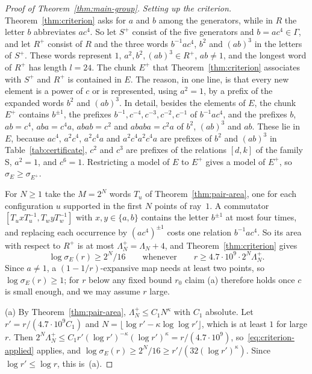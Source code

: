 \begin{proof}[Proof of Theorem~\ref{thm:main-group}]
\emph{Setting up the criterion.} Theorem~\ref{thm:criterion} asks for $a$ and $b$ among the generators, while in $R$ the letter $b$ abbreviates
$ac^4$. So let $S^+$ consist of the five generators and $b=ac^4\in\Gamma$, and let $R^+$ consist of $R$ and the three words $b^{-1}ac^4$, $b^2$
and $(ab)^3$ in the letters of $S^+$. These words represent $1$, $a^2,b^2,(ab)^3\in R^+$, $ab\ne1$, and the longest word of $R^+$ has length
$l=24$. The chunk $E^+$ that Theorem~\ref{thm:criterion} associates with $S^+$ and $R^+$ is contained in $E$. The reason, in one line, is that
every new element is a power of $c$ or is represented, using $a^2=1$, by a prefix of the expanded words $b^2$ and $(ab)^3$. In detail, besides
the elements of $E$, the chunk $E^+$ contains $b^{\pm1}$, the prefixes $b^{-1},c^{-4},c^{-3},c^{-2},c^{-1}$ of $b^{-1}ac^4$, and the prefixes $b$,
$ab=c^4$, $aba=c^4a$, $abab=c^2$ and $ababa=c^2a$ of $b^2$, $(ab)^3$ and $ab$. These lie in $E$, because $ac^4$, $a^2c^4$, $a^2c^4a$ and
$a^2c^4a^2c^4a$ are prefixes of $b^2$ and $(ab)^3$ in Table~\ref{tab:certificate}, $c^2$ and $c^3$ are prefixes of the relations $[d,k]$ of the
family \textsf{S}, $a^2=1$, and $c^6=1$. Restricting a model of $E$ to $E^+$ gives a model of $E^+$, so $\sigma_E\ge\sigma_{E^+}$.

For $N\ge1$ take the $M=2^N$ words $T_u$ of Theorem~\ref{thm:pair-area}, one for each configuration $u$ supported in the first $N$ points of
ray~$1$. A commutator $[T_uxT_u^{-1},T_wyT_w^{-1}]$ with $x,y\in\{a,b\}$ contains the letter $b^{\pm1}$ at most four times, and replacing each
occurrence by $(ac^4)^{\pm1}$ costs one relation $b^{-1}ac^4$. So its area with respect to $R^+$ is at most $\Lambda^+_N=\Lambda_N+4$, and
Theorem~\ref{thm:criterion} gives
\begin{equation}\label{eq:criterion-applied}
\log\sigma_E(r)\ge2^N/16\qquad\text{whenever}\qquad r\ge4.7\cdot10^{9}\cdot2^N\Lambda^+_N .
\end{equation}
Since $a\ne1$, a $(1-1/r)$-expansive map needs at least two points, so $\log\sigma_E(r)\ge1$; for $r$ below any fixed bound $r_0$ claim (a)
therefore holds once $c$ is small enough, and we may assume $r$ large.

(a) By Theorem~\ref{thm:pair-area}, $\Lambda^+_N\le C_1N^\kappa$ with $C_1$ absolute. Let $r'=r/(4.7\cdot10^9C_1)$ and
$N=\lfloor\log r'-\kappa\log\log r'\rfloor$, which is at least $1$ for large $r$. Then
$2^N\Lambda^+_N\le C_1r'(\log r')^{-\kappa}(\log r')^\kappa=r/(4.7\cdot10^9)$, so~\eqref{eq:criterion-applied} applies, and
$\log\sigma_E(r)\ge2^N/16\ge r'/(32(\log r')^\kappa)$. Since $\log r'\le\log r$, this is~(a).


\end{proof}
